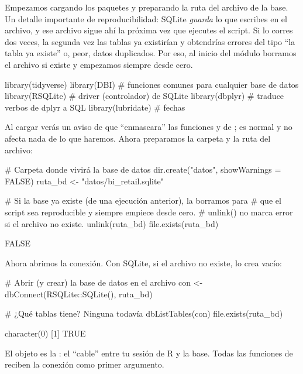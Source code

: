 Empezamos cargando los paquetes y preparando la ruta del archivo de la base.
Un detalle importante de reproducibilidad: SQLite \emph{guarda} lo que
escribes en el archivo, y ese archivo sigue ahí la próxima vez que ejecutes
el script. Si lo corres dos veces, la segunda vez las tablas ya existirían y
obtendrías errores del tipo ``la tabla ya existe'' o, peor, datos
duplicados. Por eso, al inicio del módulo borramos el archivo si existe y
empezamos siempre desde cero.

\begin{rcode}
library(tidyverse)
library(DBI)        # funciones comunes para cualquier base de datos
library(RSQLite)    # driver (controlador) de SQLite
library(dbplyr)     # traduce verbos de dplyr a SQL
library(lubridate)  # fechas
\end{rcode}

Al cargar  verás un aviso de que ``enmascara'' las
funciones  y  de ; es normal y
no afecta nada de lo que haremos. Ahora preparamos la carpeta y la ruta del
archivo:

\begin{rcode}
# Carpeta donde vivirá la base de datos
dir.create("datos", showWarnings = FALSE)
ruta_bd <- "datos/bi_retail.sqlite"

# Si la base ya existe (de una ejecución anterior), la borramos para
# que el script sea reproducible y siempre empiece desde cero.
# unlink() no marca error si el archivo no existe.
unlink(ruta_bd)
file.exists(ruta_bd)
\end{rcode}

\begin{rsalida}
[1] FALSE
\end{rsalida}

Ahora abrimos la conexión. Con SQLite, si el archivo no existe,
 lo crea vacío:

\begin{rcode}
# Abrir (y crear) la base de datos en el archivo
con <- dbConnect(RSQLite::SQLite(), ruta_bd)

# ¿Qué tablas tiene? Ninguna todavía
dbListTables(con)
file.exists(ruta_bd)
\end{rcode}

\begin{rsalida}
character(0)
[1] TRUE
\end{rsalida}

El objeto  es la : el ``cable'' entre tu
sesión de R y la base. Todas las funciones de  reciben la
conexión como primer argumento.

